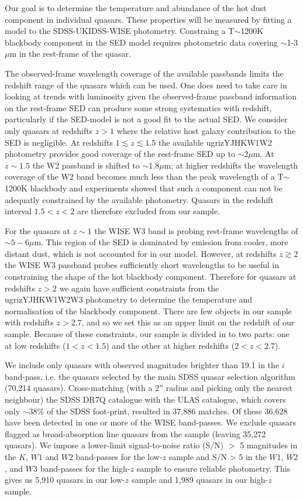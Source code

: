 Our goal is to determine the temperature and abundance of the hot dust component in individual quasars.  
These properties will be measured by fitting a model to the SDSS-UKIDSS-WISE photometry. 
Constraing a T$\sim$1200K blackbody component in the SED model requires photometric data covering $\sim$1-3$\mu$m in the rest-frame of the quasar. 

The observed-frame wavelength coverage of the available passbands limits the redshift range of the quasars which can be used. 
One does need to take care in looking at trends with luminosity given the observed-frame passband information on the rest-frame SED can produce some strong systematics with redshift, particularly if the SED-model is not a good fit to the actual SED. 
We consider only quasars at redshifts $z>1$ where the relative host galaxy contribution to the SED is negligible. 
At redshifts $1 \lesssim z \lesssim 1.5$ the available ugrizYJHKW1W2 photometry provides good coverage of the rest-frame SED up to $\sim$2$\mu$m.
At $z\sim1.5$ the W2 passband is shifted to $\sim$1.8$\mu$m; at higher redshifts the wavelength coverage of the W2 band becomes much less than the peak wavelength of a T$\sim$1200K blackbody and experiments showed that such a component can not be adequatly constrained by the available photometry. 
Quasars in the redshift interval $1.5 < z < 2$ are therefore excluded from our sample. 

For the quasars at $z \sim 1$ the WISE W3 band is probing rest-frame wavelengths of $\sim5-6\mu$m. 
This region of the SED is dominated by emission from cooler, more distant dust, which is not accounted for in our model.
However, at redshifts $z \gtrsim 2$ the WISE W3 passband probes sufficiently short wavelengths to be useful in constraining the shape of the hot blackbody component. 
Therefore for quasars at redshifts $z > 2$ we again have sufficient constraints from the ugrizYJHKW1W2W3 photometry to determine the temperature and normalisation of the blackbody component. 
There are few objects in our sample with redshifts $z > 2.7$, and so we set this as an upper limit on the redshift of our sample. 
Because of these constraints, our sample is divided in to two parts: one at low redshifts ($1 < z < 1.5$) and the other at higher redshifts ($2 < z < 2.7$). 

We include only quasars with observed magnitudes brighter than 19.1 in the $i$ band-pass, i.e. the quasars selected by the main SDSS quasar selection algorithm (70,214 quasars). 
Cross-matching (with a 2$''$ radius and picking only the nearest neighbour) the SDSS DR7Q catalogue with the ULAS catalogue, which covers only $\sim 38$\% of the SDSS foot-print, resulted in 37,886 matches. 
Of these 36,628 have been detected in one or more of the WISE band-passes. 
We exclude quasars flagged as broad-absorption line quasars from the sample (leaving 35,272 quasars).
We impose a lower-limit signal-to-noise ratio (S/N) $>$ 5 magnitudes in the $K$, $W1$ and $W2$ band-passes for the low-$z$ sample and S/N > 5 in the $W1$, $W2$, and $W3$ band-passes for the high-$z$ sample to ensure reliable photometry. 
This gives us 5,910 quasars in our low-$z$ sample and 1,989 quasars in our high-$z$ sample. 

